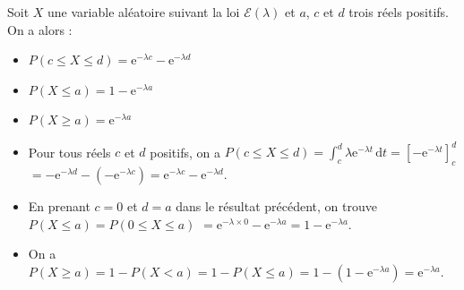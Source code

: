 \documentclass{cornouaille}
\begin{document}
\begin{propriete}
Soit $X$ une variable aléatoire suivant la loi $\mathcal{E}\left(\lambda\right)$ et $a$, $c$ et $d$ trois réels positifs. On a alors :


\begin{minipage}{0.39\linewidth}

\begin{itemize}
\item ${P\left(c\leqslant X\leqslant d\right)=\textrm{e}^{-\lambda c}-\textrm{e}^{-\lambda d}}$
\end{itemize}

\end{minipage}

\hfill

\begin{minipage}{0.31\linewidth}

\begin{itemize}
\item $P\left(X \leqslant a \right)=1-\textrm{e}^{-\lambda a}$
\end{itemize}

\end{minipage}

\hfill

\begin{minipage}{0.25\linewidth}

\begin{itemize}
\item $P\left(X \geqslant a \right)=\textrm{e}^{-\lambda a}$
\end{itemize}

\end{minipage}






\end{propriete}



\begin{preuve}

\begin{itemize}
\item Pour tous réels $c$ et $d$ positifs, on a $P(c\leqslant X \leqslant d)=\displaystyle \int_{c}^{d} \lambda\textrm{e}^{-\lambda t} \, \textrm{d}t=\left[-\textrm{e}^{-\lambda t}\right]_{c}^{d}$ ${=-\textrm{e}^{-\lambda d}-\left(-\textrm{e}^{-\lambda c}\right)=\textrm{e}^{-\lambda c}-\textrm{e}^{-\lambda d}}$.
\item En prenant $c=0$ et $d=a$ dans le résultat précédent, on trouve $P\left(X \leqslant a \right)=P\left(0 \leqslant X \leqslant a \right)$ ${=\textrm{e}^{-\lambda \times 0}-\textrm{e}^{-\lambda a}=1-\textrm{e}^{-\lambda a}}$.
\item On a $P\left(X \geqslant a \right)=1-P\left(X<a\right)=1-P\left(X\leqslant a\right)=1-\left(1-\textrm{e}^{-\lambda a}\right)=\textrm{e}^{-\lambda a}$.
\end{itemize}

\end{preuve}
\end{document}

